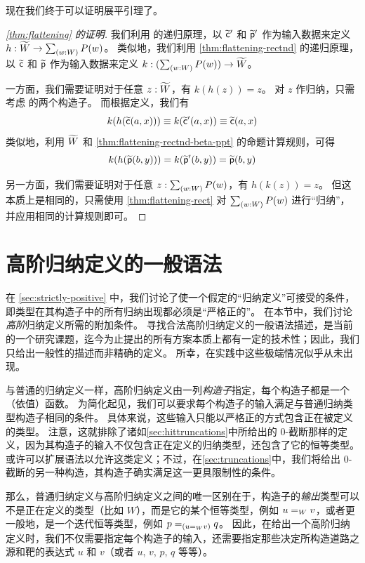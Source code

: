现在我们终于可以证明展平引理了。

\begin{proof}[\cref{thm:flattening} 的证明]
  我们利用 \Wtil 的递归原理，以 $\cct'$ 和 $\ppt'$ 作为输入数据来定义 $h:\Wtil \to \sm{w:W}P(w)$。
  类似地，我们利用 \cref{thm:flattening-rectnd} 的递归原理，以 $\cct$ 和 $\ppt$ 作为输入数据来定义 $k:(\sm{w:W}P(w)) \to \Wtil$。

  一方面，我们需要证明对于任意 $z:\Wtil$，有 $k(h(z))=z$。
  对 $z$ 作归纳，只需考虑 \Wtil 的两个构造子。
  而根据定义，我们有
  \[k(h(\cct(a,x))) \jdeq k(\cct'(a,x)) \jdeq \cct(a,x)\]
  类似地，利用 $\Wtil$ 和 \cref{thm:flattening-rectnd-beta-ppt} 的命题计算规则，可得
  \[\ap k{\ap h{\ppt(b,y)}} = \ap k{\ppt'(b,y)} = \ppt(b,y) \]

  另一方面，我们需要证明对于任意 $z:\sm{w:W}P(w)$，有 $h(k(z))=z$。
  但这本质上是相同的，只需使用 \cref{thm:flattening-rect} 对 $\sm{w:W}P(w)$ 进行``归纳''，并应用相同的计算规则即可。
\end{proof}

\section{高阶归纳定义的一般语法}
\label{sec:naturality}

在 \cref{sec:strictly-positive} 中，我们讨论了使一个假定的``归纳定义''可接受的条件，即类型在其构造子中的所有归纳出现都必须是``严格正的''。
在本节中，我们讨论\emph{高阶}归纳定义所需的附加条件。
寻找合法高阶归纳定义的一般语法描述，是当前的一个研究课题，迄今为止提出的所有方案本质上都有一定的技术性；因此，我们只给出一般性的描述而非精确的定义。
所幸，在实践中这些极端情况似乎从未出现。

与普通的归纳定义一样，高阶归纳定义由一列\emph{构造子}指定，每个构造子都是一个（依值）函数。
为简化起见，我们可以要求每个构造子的输入满足与普通归纳类型构造子相同的条件。
具体来说，这些输入只能以严格正的方式包含正在被定义的类型。
注意，这就排除了诸如\cref{sec:hittruncations}中所给出的 $0$-截断那样的定义，因为其构造子的输入不仅包含正在定义的归纳类型，还包含了它的恒等类型。
或许可以扩展语法以允许这类定义；不过，在\cref{sec:truncations}中，我们将给出 $0$-截断的另一种构造，其构造子确实满足这一更具限制性的条件。

那么，普通归纳定义与高阶归纳定义之间的唯一区别在于，构造子的\emph{输出}类型可以不是正在定义的类型（比如 $W$），而是它的某个恒等类型，例如 $\id[W]uv$，或者更一般地，是一个迭代恒等类型，例如 $\id[({\id[W]uv})]pq$。
因此，在给出一个高阶归纳定义时，我们不仅需要指定每个构造子的输入，还需要指定那些决定所构造道路之源和靶的表达式 $u$ 和 $v$（或者 $u$, $v$, $p$, $q$ 等等）。

